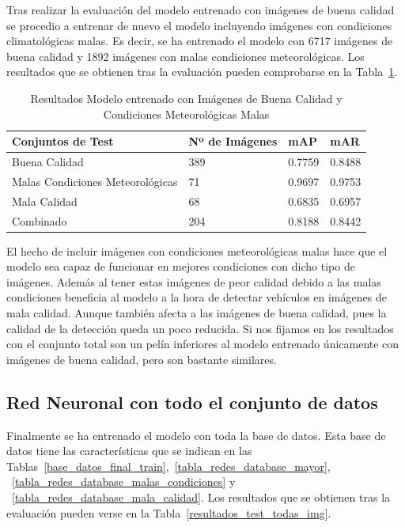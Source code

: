Tras realizar la evaluación del modelo entrenado con imágenes de buena calidad se procedio a entrenar de nuevo el modelo incluyendo imágenes con condiciones climatológicas malas. Es decir, se ha entrenado el modelo con 6717 imágenes de buena calidad y 1892 imágenes con malas condiciones meteorológicas. Los resultados que se obtienen tras la evaluación pueden comprobarse en la Tabla~\ref{resultados_test_buenas_malas_condiciones}.

\begin{table}[htbp][H] 
\begin{center}
\begin{tabular}{|l|l|l|l|}
\hline
 Conjuntos de Test & Nº de Imágenes & mAP & mAR  \\ 
\hline \hline
Buena Calidad & 389 & 0.7759 & 0.8488 \\ \hline
Malas Condiciones Meteorológicas & 71 & 0.9697 & 0.9753 \\ \hline
Mala Calidad  & 68 & 0.6835 & 0.6957\\ \hline
Combinado & 204 & 0.8188 & 0.8442\\ \hline
\end{tabular}
\caption{Resultados Modelo entrenado con Imágenes de Buena Calidad y Condiciones Meteorológicas Malas}
\label{resultados_test_buenas_malas_condiciones}
\end{center}
\end{table}

El hecho de incluir imágenes con condiciones meteorológicas malas hace que el modelo sea capaz de funcionar en mejores condiciones con dicho tipo de imágenes. Además al tener estas imágenes de peor calidad debido a las malas condiciones beneficia al modelo a la hora de detectar vehículos en imágenes de mala calidad. Aunque también afecta a las imágenes de buena calidad, pues la calidad de la detección queda un poco reducida. Si nos fijamos en los resultados con el conjunto total son un pelín inferiores al modelo entrenado únicamente con imágenes de buena calidad, pero son bastante similares.


\subsection{Red Neuronal con todo el conjunto de datos}

Finalmente se ha entrenado el modelo con toda la base de datos. Esta base de datos tiene las características que se indican en las Tablas~\ref{base_datos_final_train},~\ref{tabla_redes_database_mayor}, ~\ref{tabla_redes_database_malas_condiciones} y ~\ref{tabla_redes_database_mala_calidad}. Los resultados que se obtienen tras la evaluación pueden verse en la Tabla~\ref{resultados_test_todas_img}.

